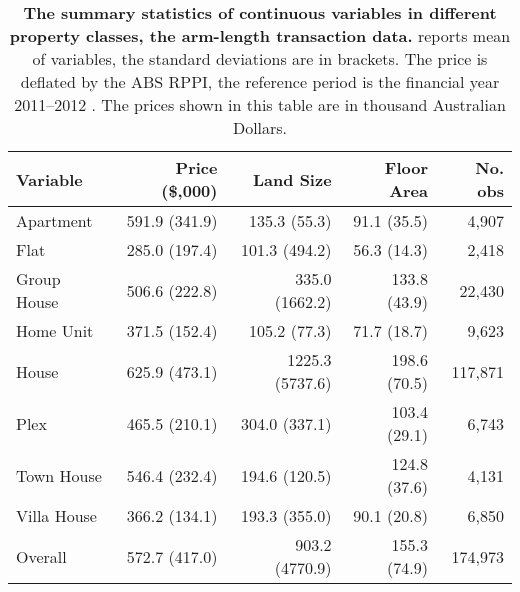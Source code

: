 \begin{table}[ht]
\centering
\caption{{\bf The summary statistics of continuous variables in different property classes, the arm-length transaction data.} reports mean of variables, the standard deviations are in brackets. The price is deflated by the ABS RPPI, the reference period is the financial year 2011--2012 . The prices shown in this table are in thousand Australian Dollars.\setlength{\baselineskip}{1.25em}}
\label{tab_summary_stats_variables_propertyclass}
\setlength{\baselineskip}{1.25em}
\begin{threeparttable}
\begin{tabular}{lrrrr}
\toprule\toprule
Variable    &Price (\$,000)   &Land Size       &Floor Area   &No. obs\\
\midrule
Apartment   &591.9 (341.9)    &135.3 (55.3)    &91.1 (35.5)  &4,907\\
Flat        &285.0 (197.4)    &101.3 (494.2)   &56.3 (14.3)  &2,418\\
Group House &506.6 (222.8)    &335.0 (1662.2)  &133.8 (43.9) &22,430\\
Home Unit   &371.5 (152.4)    &105.2 (77.3)    &71.7 (18.7)  &9,623\\
House       &625.9 (473.1)    &1225.3 (5737.6) &198.6 (70.5) &117,871\\
Plex        &465.5 (210.1)    &304.0 (337.1)   &103.4 (29.1) &6,743\\
Town House  &546.4 (232.4)    &194.6 (120.5)   &124.8 (37.6) &4,131\\
Villa House &366.2 (134.1)    &193.3 (355.0)   &90.1 (20.8)  &6,850\\
\hline
Overall     &572.7 (417.0)    &903.2 (4770.9)  &155.3 (74.9) &174,973\\
\bottomrule\bottomrule
\end{tabular} 
\end{threeparttable}
\end{table}